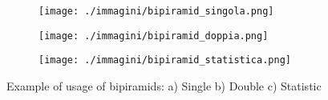 \begin{figure}[ht]
    \centering
    \begin{subfigure}[b]{0.3\textwidth}
        \texttt{[image: ./immagini/bipiramid\_singola.png]}
        \caption{}
        \label{fig:bipiramid1}
    \end{subfigure}
    \hfill
    \begin{subfigure}[b]{0.3\textwidth}
        \texttt{[image: ./immagini/bipiramid\_doppia.png]}
        \caption{}
        \label{fig:bipiramid2}
    \end{subfigure}
    \hfill
    \begin{subfigure}[b]{0.3\textwidth}
        \texttt{[image: ./immagini/bipiramid\_statistica.png]}
        \caption{}
        \label{fig:bipiramid3}
    \end{subfigure}
    \caption{Example of usage of bipiramids: a) Single b) Double c) Statistic}
    \label{fig:bipiramid_type}
\end{figure}
